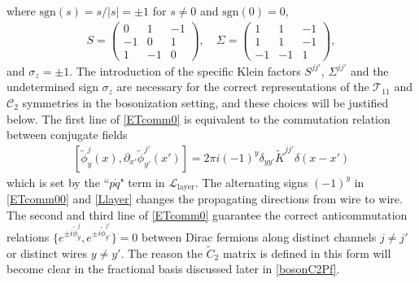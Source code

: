 where $\mathrm{sgn}(s)=s/|s|=\pm1$ for $s\neq0$ and $\mathrm{sgn}(0)=0$, \begin{align}S=\left(\begin{smallmatrix}0&1&-1\\-1&0&1\\1&-1&0\end{smallmatrix}\right),\quad\Sigma=\left(\begin{smallmatrix}1&1&-1\\1&1&-1\\-1&-1&1\end{smallmatrix}\right),\label{Kleinfactors}\end{align} and $\sigma_z=\pm1$. The introduction of the specific Klein factors $S^{jj'}$, $\Sigma^{jj'}$ and the undetermined sign $\sigma_z$ are necessary for the correct representations of the $\mathcal{T}_{11}$ and $\mathcal{C}_2$ symmetries in the bosonization setting, and these choices will be justified below. The first line of \eqref{ETcomm0} is equivalent to the commutation relation between conjugate fields \begin{align}\left[\tilde\phi_y^j(x),\partial_{x'}\tilde\phi_{y'}^{j'}(x')\right]=2\pi i(-1)^y\delta_{yy'}\tilde{K}^{jj'}\delta(x-x')\label{ETcomm00}\end{align} which is set by the ``$p\dot{q}$" term in $\mathcal{L}_{\mathrm{layer}}$. The alternating signs $(-1)^y$ in \eqref{ETcomm00} and \eqref{Llayer} changes the propagating directions from wire to wire. The second and third line of \eqref{ETcomm0} guarantee the correct anticommutation relations $\{e^{\pm i\tilde\phi^j_y},e^{\pm i\tilde\phi^{j'}_{y'}}\}=0$ between Dirac fermions along distinct channels $j\neq j'$ or distinct wires $y\neq y'$. The reason the $\tilde{C}_2$ matrix is defined in this form will become clear in the fractional basis discussed later in \eqref{bosonC2Pf}.

